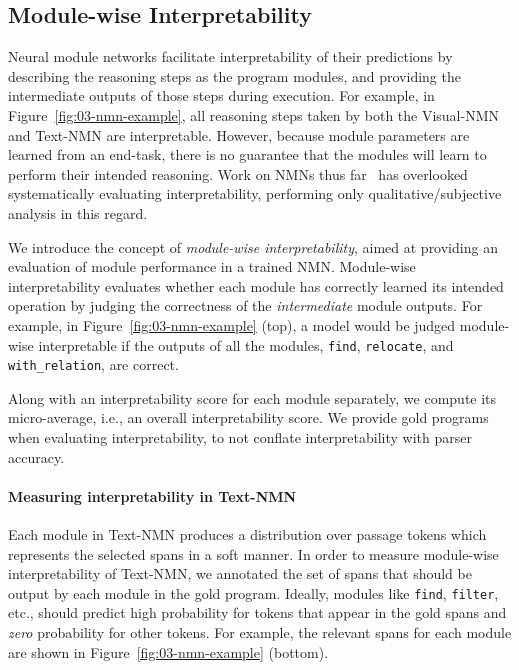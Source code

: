 \documentclass[main.tex]{subfiles}
\begin{document}
\subsection{Module-wise Interpretability}
\label{ssec:measure}
Neural module networks facilitate interpretability of their predictions by describing the reasoning steps as the program modules, and providing the intermediate outputs of those steps during execution.
For example, in Figure~\ref{fig:03-nmn-example}, all reasoning steps taken by both the Visual-NMN and Text-NMN are interpretable.
However, because module parameters are learned from an end-task, there is no guarantee that the modules will learn to perform their intended reasoning.
Work on NMNs thus far~\cite{explainablenmn-hu-2018,jiang-nmn-2019} has overlooked systematically evaluating interpretability, performing only qualitative/subjective analysis in this regard.

We introduce the concept of \textit{module-wise interpretability}, aimed at providing an evaluation of module performance in a trained NMN.
Module-wise interpretability evaluates whether each module has correctly learned its intended operation by judging the correctness of the \emph{intermediate} module outputs.
For example, in Figure~\ref{fig:03-nmn-example} (top), a model would be judged module-wise interpretable if the outputs of all the modules, \texttt{find}, \texttt{relocate}, and \texttt{with\_relation}, are correct.

Along with an interpretability score for each module separately, we compute its micro-average, i.e., an overall interpretability score.
We provide gold programs when evaluating interpretability, to not conflate  interpretability with parser accuracy.

\paragraph{Measuring interpretability in Text-NMN}
Each module in Text-NMN produces a distribution over passage tokens which represents the selected spans in a soft manner.
In order to measure module-wise interpretability of Text-NMN, we
annotated the set of spans that should be output by each module in the gold program.
Ideally, modules like \texttt{find}, \texttt{filter}, etc., should predict high probability for tokens that appear in the gold spans and \textit{zero} probability for other tokens. For example, the relevant spans for each module are shown in Figure~\ref{fig:03-nmn-example} (bottom).
\end{document}
